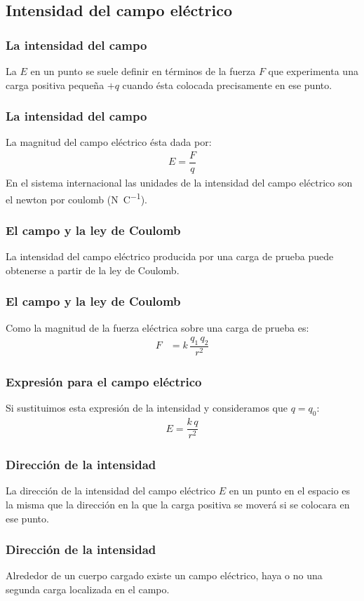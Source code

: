 \documentclass[14pt]{beamer}
\begin{document}
\subsection{Intensidad del campo eléctrico}

\begin{frame}
\frametitle{La intensidad del campo}
La  $E$ en un punto \pause se suele definir en términos de la
fuerza $F$ que experimenta una carga positiva pequeña $+q$ cuando ésta colocada precisamente en ese punto.
\end{frame}
\begin{frame}
\frametitle{La intensidad del campo}
La magnitud del campo eléctrico ésta dada por:
\pause
\begin{align*}
E = \dfrac{F}{q}
\end{align*}
En el sistema internacional las unidades de la intensidad del campo eléctrico son el newton por coulomb (\unit{\newton\per\coulomb}).
\end{frame}
\begin{frame}
\frametitle{El campo y la ley de Coulomb}
La intensidad del campo eléctrico producida por una carga de prueba puede obtenerse a partir de la ley de Coulomb.
\end{frame}
\begin{frame}
\frametitle{El campo y la ley de Coulomb}
Como la magnitud de la fuerza eléctrica sobre una carga de prueba es:
\pause
\begin{align*}
F &= k \, \dfrac{q_{1} \, q_{2}}{r^{2}}
\end{align*}
\end{frame}
\begin{frame}
\frametitle{Expresión para el campo eléctrico}
Si sustituimos esta expresión de la intensidad y consideramos que $q = q_{0}$:
\pause
\begin{align*}
E = \dfrac{k \, q}{r^{2}}
\end{align*}
\end{frame}
\begin{frame}
\frametitle{Dirección de la intensidad}
La dirección de la intensidad del campo eléctrico $E$ en un punto en el espacio es la misma que la dirección en la que la carga positiva se moverá si se colocara en ese punto.
\end{frame}
\begin{frame}
\frametitle{Dirección de la intensidad}
Alrededor de un cuerpo cargado existe un campo eléctrico, haya o no una segunda carga localizada en el campo.
\end{frame}
\end{document}
